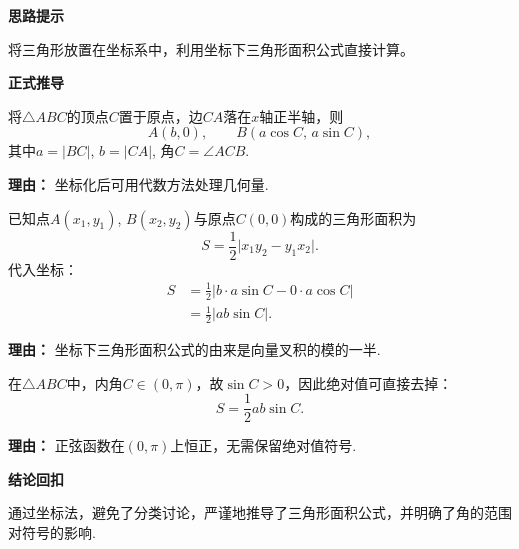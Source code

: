 \begin{proofbox}
	\textbf{\textcolor{CProof}{思路提示}}

	将三角形放置在坐标系中，利用坐标下三角形面积公式直接计算。

	\medskip
	\textbf{\textcolor{CProof}{正式推导}}
	\begin{description}[style=nextline, leftmargin=2.8em, labelsep=0.5em, itemsep=0.55em]
		\item[\textbf{步骤一（建立坐标系）：}] 将$\triangle ABC$的顶点$C$置于原点，边$CA$落在$x$轴正半轴，则
			\[
				A(b,0),
				\qquad
				B(a\cos C,\, a\sin C),
			\]
			其中$a=|BC|$, $b=|CA|$, 角$C=\angle ACB$.
			\par\textbf{理由：}
			坐标化后可用代数方法处理几何量.

		\item[\textbf{步骤二（坐标面积公式）：}] 已知点$A(x_1,y_1)$, $B(x_2,y_2)$与原点$C(0,0)$构成的三角形面积为
			\[
				S = \frac12 \bigl| x_1 y_2 - y_1 x_2 \bigr|.
			\]
			代入坐标：
			\[
				\begin{aligned}
					S &= \frac12 \bigl| b \cdot a\sin C - 0 \cdot a\cos C \bigr| \\
					&= \frac12 \bigl| ab\sin C \bigr|.
			\end{aligned}
			\]
			\par\textbf{理由：}
			坐标下三角形面积公式的由来是向量叉积的模的一半.

		\item[\textbf{步骤三（确定符号）：}] 在$\triangle ABC$中，内角$C\in(0,\pi)$，故$\sin C > 0$，因此绝对值可直接去掉：
			\[
				S = \frac12 ab\sin C.
			\]
			\par\textbf{理由：}
			正弦函数在$(0,\pi)$上恒正，无需保留绝对值符号.
	\end{description}

	\medskip
	\textbf{\textcolor{CProof}{结论回扣}}

	通过坐标法，避免了分类讨论，严谨地推导了三角形面积公式，并明确了角的范围对符号的影响.
\end{proofbox}
